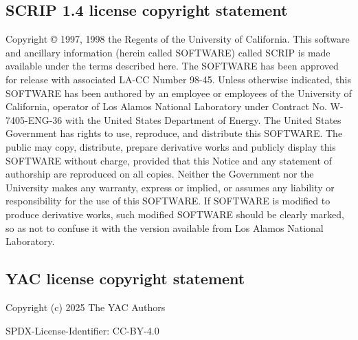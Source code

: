 \subsection{SCRIP 1.4 license copyright statement}
\label{sec_SCRIP}

Copyright © 1997, 1998 the Regents of the University of California.
This software and ancillary information (herein called SOFTWARE)
called SCRIP is made available under the terms described here. The
SOFTWARE has been approved for release with associated LA-CC Number
98-45. Unless otherwise indicated, this SOFTWARE has been authored by
an employee or employees of the University of California, operator of
Los Alamos National Laboratory under Contract No. W-7405-ENG-36 with
the United States Department of Energy. The United States Government
has rights to use, reproduce, and distribute this SOFTWARE. The public
may copy, distribute, prepare derivative works and publicly display
this SOFTWARE without charge, provided that this Notice and any
statement of authorship are reproduced on all copies. Neither the
Government nor the University makes any warranty, express or implied,
or assumes any liability or responsibility for the use of this
SOFTWARE. If SOFTWARE is modified to produce derivative works, such
modified SOFTWARE should be clearly marked, so as not to confuse it
with the version available from Los Alamos National Laboratory.

\subsection{YAC license copyright statement}
\label{sec_YAC}

Copyright (c) 2025 The YAC Authors

SPDX-License-Identifier: CC-BY-4.0
